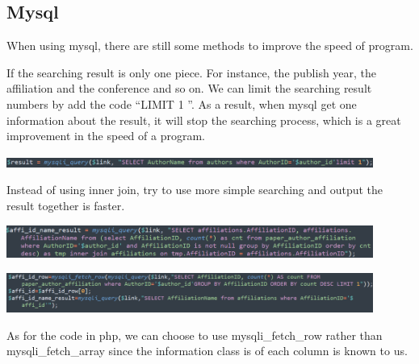 \documentclass[10pt,twoside,a4paper,titlepage]{article}
\begin{document}
\subsection{Mysql}
When using mysql, there are still some methods to improve the speed of program.\par If the searching result is only one piece. For instance, the publish year, the affiliation and the conference and so on. We can limit the searching result numbers by add the code “LIMIT 1 ”. As a result, when mysql get one information about the result, it will stop the searching process, which is a great improvement in the speed of a program.\par
\includegraphics[width=0.9\textwidth]{jaf/limit.PNG}\newline\par
 Instead of using inner join, try to use more simple searching and output the result together is faster.\par
\includegraphics[width=0.9\textwidth]{jaf/affold.PNG}\newline\par
\includegraphics[width=0.9\textwidth]{jaf/affnew.PNG}\newline\par
As for the code in php, we can choose to use mysqli\_fetch\_row rather than mysqli\_fetch\_array since the information class is of each column is known to us.\par
\end{document}
